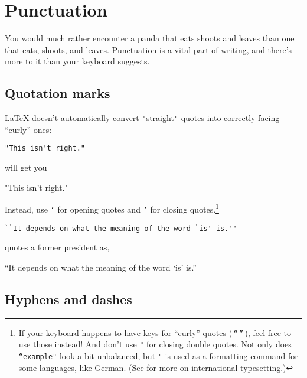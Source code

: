 \chapter{Punctuation}
\label{punctuation}

You would much rather encounter a panda that eats
shoots and leaves than one that eats, shoots,
and leaves.\punckern{}
Punctuation is a vital part of writing,
and there's more to it than your keyboard suggests.

\section{Quotation marks}

\LaTeX{} doesn't automatically convert \texttt{"}straight\texttt{"} quotes
into correctly-facing ``curly'' ones:
\begin{leftfigure}
\begin{lstlisting}
"This isn't right."
\end{lstlisting}
\end{leftfigure}
will get you
\begin{leftfigure}
\lm%
"This isn't right."
\end{leftfigure}
Instead, use \texttt{\bfseries `} for opening quotes and \texttt{\bfseries '} for closing
quotes.\punckern\footnote{If your keyboard happens to have keys for
``curly'' quotes (\,\texttt{“}\,\texttt{”}\,), feel free to use those instead!
And don't use \texttt{"} for closing double quotes.
Not only does \texttt{``example"} look a bit unbalanced,
but \texttt{"} is used as a formatting command for some languages,
like German.
(See  for more on international typesetting.)}
\begin{leftfigure}
\begin{lstlisting}
``It depends on what the meaning of the word `is' is.''
\end{lstlisting}
\end{leftfigure}
quotes a former  president as,
\begin{leftfigure}
\lm%
``It depends on what the meaning of the word `is' is.''
\end{leftfigure}

\section{Hyphens and dashes}

